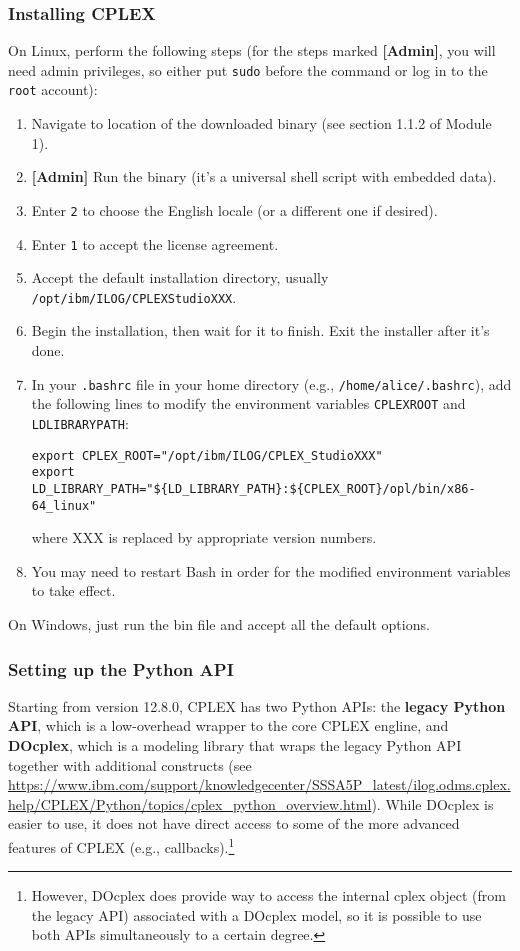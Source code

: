 \documentclass[12pt]{article}
\begin{document}
\subsubsection{Installing CPLEX}
On Linux, perform the following steps (for the steps marked \textbf{[Admin]}, you will need admin privileges, so either put \texttt{sudo} before the command or log in to the \texttt{root} account):
\begin{enumerate}
    \item Navigate to location of the downloaded binary (see section 1.1.2 of Module 1).
    \item \textbf{[Admin]} Run the binary (it's a universal shell script with embedded data).
    \item Enter \texttt{2} to choose the English locale (or a different one if desired).
    \item Enter \texttt{1} to accept the license agreement.
    \item Accept the default installation directory, usually \texttt{/opt/ibm/ILOG/CPLEX\ttul StudioXXX}.
    \item Begin the installation, then wait for it to finish. 
        Exit the installer after it's done.
    \item In your \texttt{.bashrc} file in your home directory (e.g., \texttt{/home/alice/.bashrc}), add the following lines to modify the environment variables \texttt{CPLEX\ttul ROOT} and \texttt{LD\ttul LIBRARY\ttul PATH}:
\begin{verbatim}
export CPLEX_ROOT="/opt/ibm/ILOG/CPLEX_StudioXXX"
export LD_LIBRARY_PATH="${LD_LIBRARY_PATH}:${CPLEX_ROOT}/opl/bin/x86-64_linux"
\end{verbatim}
        where XXX is replaced by appropriate version numbers.
    \item You may need to restart Bash in order for the modified environment variables to take effect.
\end{enumerate}
On Windows, just run the bin file and accept all the default options.

\subsubsection{Setting up the Python API}
Starting from version 12.8.0, CPLEX has two Python APIs: the \textbf{legacy Python API}, which is a low-overhead wrapper to the core CPLEX engline, and \textbf{DOcplex}, which is a modeling library that wraps the legacy Python API together with additional constructs (see \url{https://www.ibm.com/support/knowledgecenter/SSSA5P_latest/ilog.odms.cplex.help/CPLEX/Python/topics/cplex_python_overview.html}).
While DOcplex is easier to use, it does not have direct access to some of the more advanced features of CPLEX (e.g., callbacks).\footnote{
    However, DOcplex does provide way to access the internal cplex object (from the legacy API) associated with a DOcplex model, so it is possible to use both APIs simultaneously to a certain degree.
}
\end{document}
